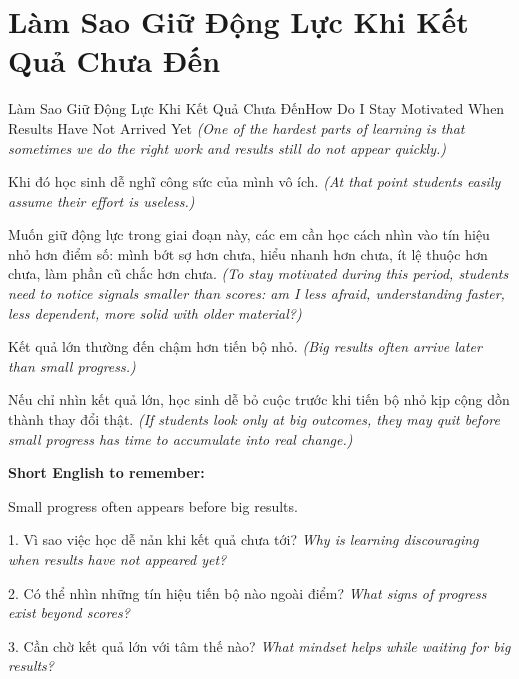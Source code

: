 \section{Làm Sao Giữ Động Lực Khi Kết Quả Chưa Đến}
\begin{truyen}{Làm Sao Giữ Động Lực Khi Kết Quả Chưa Đến}{How Do I Stay Motivated When Results Have Not Arrived Yet}
\textit{(One of the hardest parts of learning is that sometimes we do the right work and results still do not appear quickly.)}

Khi đó học sinh dễ nghĩ công sức của mình vô ích.
\textit{(At that point students easily assume their effort is useless.)}

Muốn giữ động lực trong giai đoạn này, các em cần học cách nhìn vào tín hiệu nhỏ hơn điểm số: mình bớt sợ hơn chưa, hiểu nhanh hơn chưa, ít lệ thuộc hơn chưa, làm phần cũ chắc hơn chưa.
\textit{(To stay motivated during this period, students need to notice signals smaller than scores: am I less afraid, understanding faster, less dependent, more solid with older material?)}

Kết quả lớn thường đến chậm hơn tiến bộ nhỏ.
\textit{(Big results often arrive later than small progress.)}
\end{truyen}

\begin{baihoc}
Nếu chỉ nhìn kết quả lớn, học sinh dễ bỏ cuộc trước khi tiến bộ nhỏ kịp cộng dồn thành thay đổi thật.
\textit{(If students look only at big outcomes, they may quit before small progress has time to accumulate into real change.)}
\end{baihoc}

\begin{ghinhoanh}
\textbf{Short English to remember:}

Small progress often appears before big results.

\end{ghinhoanh}

\begin{tuhocnhanh}
1. Vì sao việc học dễ nản khi kết quả chưa tới? \textit{Why is learning discouraging when results have not appeared yet?}

2. Có thể nhìn những tín hiệu tiến bộ nào ngoài điểm? \textit{What signs of progress exist beyond scores?}

3. Cần chờ kết quả lớn với tâm thế nào? \textit{What mindset helps while waiting for big results?}
\end{tuhocnhanh}
\ngancach

